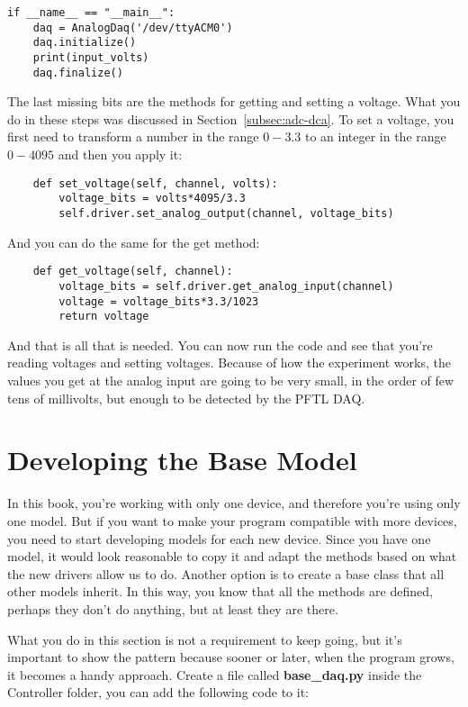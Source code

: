\begin{verbatim}
if __name__ == "__main__":
    daq = AnalogDaq('/dev/ttyACM0')
    daq.initialize()
    print(input_volts)
    daq.finalize()
\end{verbatim}

The last missing bits are the methods for getting and setting a voltage. What you do in these steps was discussed in Section~\ref{subsec:adc-dca}. To set a voltage, you first need to transform a number in the range $0-3.3$ to an integer in the range $0-4095$ and then you apply it:

\begin{verbatim}
    def set_voltage(self, channel, volts):
        voltage_bits = volts*4095/3.3
        self.driver.set_analog_output(channel, voltage_bits)
\end{verbatim}

And you can do the same for the get method:

\begin{verbatim}
    def get_voltage(self, channel):
        voltage_bits = self.driver.get_analog_input(channel)
        voltage = voltage_bits*3.3/1023
        return voltage
\end{verbatim}

And that is all that is needed. You can now run the code and see that you're reading voltages and setting voltages. Because of how the experiment works, the values you get at the analog input are going to be very small, in the order of few tens of millivolts, but enough to be detected by the {PFTL DAQ}.

\section{Developing the Base Model}\label{sec:base-model}
In this book, you're working with only one device, and therefore you're using only one model. But if you want to make your program compatible with more devices, you need to start developing models for each new device. Since you have one model, it would look reasonable to copy it and adapt the methods based on what the new drivers allow us to do. Another option is to create a base class that all other models inherit. In this way, you know that all the methods are defined, perhaps they don't do anything, but at least they are there.

What you do in this section is not a requirement to keep going, but it's important to show the pattern because sooner or later, when the program grows, it becomes a handy approach. Create a file called \textbf{base\_daq.py} inside the Controller folder, you can add the following code to it:

